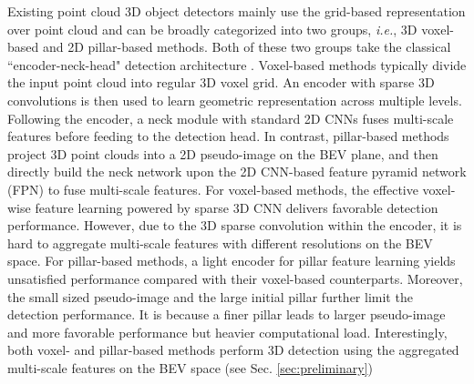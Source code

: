 \documentclass[runningheads]{llncs}
\begin{document}
Existing point cloud 3D object detectors mainly use the grid-based representation over point cloud and can be broadly categorized into two groups, \textit{i.e.}, 3D voxel-based and 2D pillar-based methods. Both of these two groups take the classical ``encoder-neck-head" detection architecture \cite{he2020structure,Hu2021AFDetV2RT,lang2019pointpillars,noh2021hvpr,wang2019voxel,yan2018second,ye2020hvnet,zheng2020ciassd,zhou2018voxelnet}.
Voxel-based methods \cite{he2020structure,Hu2021AFDetV2RT,yan2018second,zheng2020ciassd,zhou2018voxelnet} typically divide the input point cloud into regular 3D voxel grid. 
An encoder with sparse 3D convolutions \cite{graham2017submanifold} is then used to learn geometric representation across multiple levels. Following the encoder, a neck module with standard 2D CNNs fuses multi-scale features before feeding to the detection head.
In contrast, pillar-based methods \cite{lang2019pointpillars,wang2019voxel,ye2020hvnet,noh2021hvpr} project 3D point clouds into a 2D pseudo-image on the BEV plane, and then directly build the neck network upon the 2D CNN-based feature pyramid network (FPN) to fuse multi-scale features.
For voxel-based methods, the effective voxel-wise feature learning powered by sparse 3D CNN delivers favorable detection performance.
However, due to the 3D sparse convolution within the encoder, it is hard to aggregate multi-scale features with different resolutions on the BEV space.
For pillar-based methods, a light encoder for pillar feature learning yields unsatisfied performance compared with their voxel-based counterparts.
Moreover, the small sized pseudo-image and the large initial pillar further limit the detection performance.
It is because a finer pillar leads to larger pseudo-image and more favorable performance but heavier computational load.
Interestingly, both voxel- and pillar-based methods perform 3D detection using the aggregated multi-scale features on the BEV space (see Sec. \ref{sec:preliminary}) 
\end{document}
